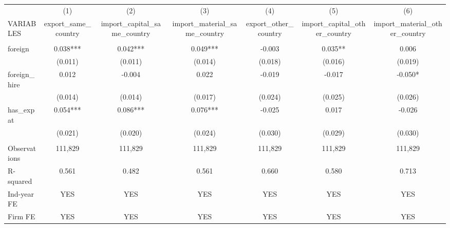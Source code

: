 \begin{tabular}{lcccccc} \hline
 & (1) & (2) & (3) & (4) & (5) & (6) \\
VARIABLES & export\_same\_country & import\_capital\_same\_country & import\_material\_same\_country & export\_other\_country & import\_capital\_other\_country & import\_material\_other\_country \\ \hline
 &  &  &  &  &  &  \\
foreign & 0.038*** & 0.042*** & 0.049*** & -0.003 & 0.035** & 0.006 \\
 & (0.011) & (0.011) & (0.014) & (0.018) & (0.016) & (0.019) \\
foreign\_hire & 0.012 & -0.004 & 0.022 & -0.019 & -0.017 & -0.050* \\
 & (0.014) & (0.014) & (0.017) & (0.024) & (0.025) & (0.026) \\
has\_expat & 0.054*** & 0.086*** & 0.076*** & -0.025 & 0.017 & -0.026 \\
 & (0.021) & (0.020) & (0.024) & (0.030) & (0.029) & (0.030) \\
 &  &  &  &  &  &  \\
Observations & 111,829 & 111,829 & 111,829 & 111,829 & 111,829 & 111,829 \\
R-squared & 0.561 & 0.482 & 0.561 & 0.660 & 0.580 & 0.713 \\
Ind-year FE & YES & YES & YES & YES & YES & YES \\
 Firm FE & YES & YES & YES & YES & YES & YES \\ \hline
\end{tabular}
